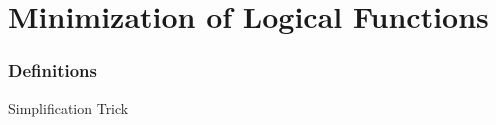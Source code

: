 \chapter{Minimization of Logical Functions}
\graphicspath{ {./chapter03/FigWork} }


\subsection{Definitions}
\begin{description}
\item[Simplification Trick]
\end{description}


